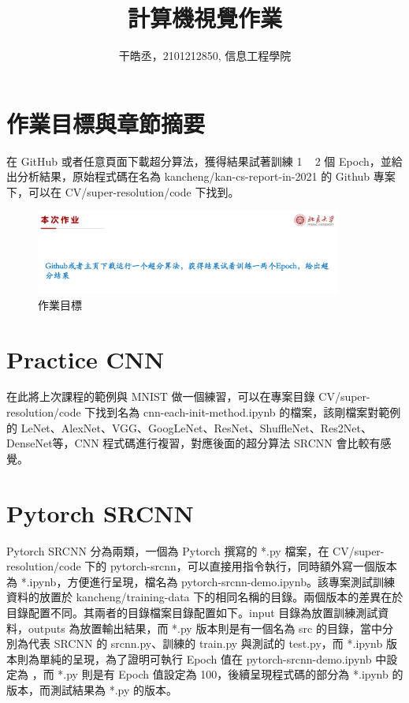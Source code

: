 \documentclass[11pt,UTF8]{ctexart}
\title{計算機視覺作業}
\author{干皓丞，2101212850, 信息工程學院}
\begin{document}
\maketitle


\section{作業目標與章節摘要}

在 GitHub 或者任意頁面下載超分算法，獲得結果試著訓練 1 ~ 2 個 Epoch，並給出分析結果，原始程式碼在名為 kancheng/kan-cs-report-in-2021 的 Github 專案下，可以在 CV/super-resolution/code 下找到。

\begin{figure}[H]
\centering 
\includegraphics[width=0.9\textwidth]{t1.png} 
\caption{作業目標}
\label{Test}
\end{figure}

\section{Practice CNN}

在此將上次課程的範例與 MNIST 做一個練習，可以在專案目錄 CV/super-resolution/code 下找到名為 cnn-each-init-method.ipynb 的檔案，該剛檔案對範例的 LeNet、AlexNet、VGG、GoogLeNet、ResNet、ShuffleNet、Res2Net、DenseNet等，CNN 程式碼進行複習，對應後面的超分算法 SRCNN 會比較有感覺。

\section{Pytorch SRCNN}

Pytorch SRCNN 分為兩類，一個為 Pytorch 撰寫的 *.py 檔案，在 CV/super-resolution/code 下的 pytorch-srcnn，可以直接用指令執行，同時額外寫一個版本為 *.ipynb，方便進行呈現，檔名為  pytorch-srcnn-demo.ipynb。該專案測試訓練資料的放置於 kancheng/training-data 下的相同名稱的目錄。兩個版本的差異在於目錄配置不同。其兩者的目錄檔案目錄配置如下。input 目錄為放置訓練測試資料，outputs 為放置輸出結果，而 *.py 版本則是有一個名為 src 的目錄，當中分別為代表 SRCNN 的 srcnn.py、訓練的 train.py 與測試的 test.py，而 *.ipynb 版本則為單純的呈現，為了證明可執行 Epoch 值在 pytorch-srcnn-demo.ipynb 中設定為 ，而 *.py 則是有 Epoch 值設定為 100，後續呈現程式碼的部分為 *.ipynb 的版本，而測試結果為 *.py 的版本。
\end{document}
